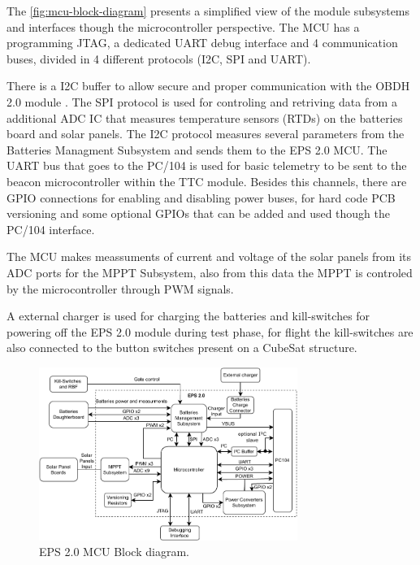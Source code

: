 The \autoref{fig:mcu-block-diagram} presents a simplified view of the module subsystems and interfaces though the microcontroller perspective. 
The MCU has a programming JTAG, a dedicated UART debug interface and 4 communication buses, divided in 4 different protocols (I2C, SPI and UART). 

There is a I2C buffer to allow secure and proper communication with the OBDH 2.0 module \cite{obdh2}.
The SPI protocol is used for controling and retriving data from a additional ADC IC that measures temperature sensors (RTDs) on the batteries board and solar panels.
The I2C protocol measures several parameters from the Batteries Managment Subsystem and sends them to the EPS 2.0 MCU.
The UART bus that goes to the PC/104 is used for basic telemetry to be sent to the beacon microcontroller within the TTC module.
Besides this channels, there are GPIO connections for enabling and disabling power buses, for hard code PCB versioning and some optional GPIOs that can be added and used though the PC/104 interface. 

The MCU makes meassuments of current and voltage of the solar panels from its ADC ports for the MPPT Subsystem, also from this data the MPPT is controled by the microcontroller through PWM signals.

A external charger is used for charging the batteries and kill-switches for powering off the EPS 2.0 module during test phase, for flight the kill-switches are also connected to the button switches present on a CubeSat structure.   

\begin{figure}[!ht]
    \begin{center}
        \includegraphics[width=0.75\textwidth]{figures/eps2_mcu_diagram.pdf}
        \caption{EPS 2.0 MCU Block diagram.}
        \label{fig:mcu-block-diagram}
    \end{center}
\end{figure}

